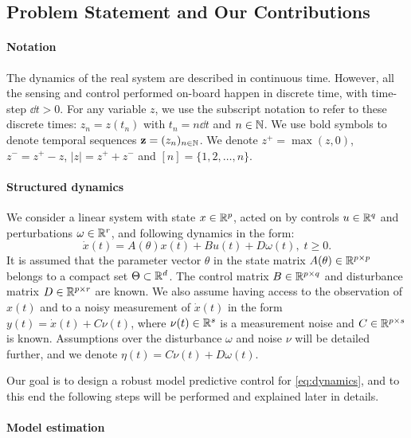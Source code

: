 \documentclass{article}
\begin{document}
\subsection{Problem Statement and Our Contributions}

\paragraph{Notation}

The dynamics of the real system are described in continuous time. However, all the sensing and control performed on-board happen in discrete time, with time-step $\dd t>0$. For any variable $z$, we use the subscript notation to refer to these discrete times: $z_n = z(t_n)$ with $t_n = n\dd t$ and $n\in\mathbb{N}$. We use bold symbols to denote temporal sequences $\mathbf{z} = (z_n)_{n\in\mathbb{N}}$. We denote $z^+ = \max(z,0)$, $z^- = z^+-z$, $|z| = z^++z^-$ and $[n]=\{1,2,\dots, n\}$.

\paragraph{Structured dynamics}
We consider a linear system with state $x\in\mathbb{R}^p$, acted on by controls $u\in\mathbb{R}^q$ and perturbations $\omega\in\mathbb{R}^r$, and following dynamics in the form:
\begin{equation}
\label{eq:dynamics}
\dot{x}(t)=A(\theta)x(t) + B u(t) + D \omega(t),\;t\geq0.
\end{equation}
 It is assumed that the parameter vector $\theta$ in the state matrix $A(\theta)\in\mathbb{R}^{p\times p}$ belongs to a compact set $\Theta \subset \mathbb{R}^d$. The control matrix $B\in\mathbb{R}^{p\times q}$ and disturbance matrix $D\in\mathbb{R}^{p\times r}$ are known. We also assume having access to the observation of $x(t)$ and to a noisy measurement of $\dot{x}(t)$ in the form $y(t)=\dot{x}(t) + C\nu(t)$, where $\nu(t)\in\mathbb{R}^s$ is a measurement noise and $C\in\mathbb{R}^{p\times s}$ is known. Assumptions over the disturbance $\omega$ and noise $\nu$ will be detailed further, and we denote $\eta(t) = C\nu(t) + D\omega(t)$. 
 
 Our goal is to design a robust model predictive control for \eqref{eq:dynamics}, and to this end the following steps will be performed and explained later in details.

\paragraph{Model estimation}
\end{document}
